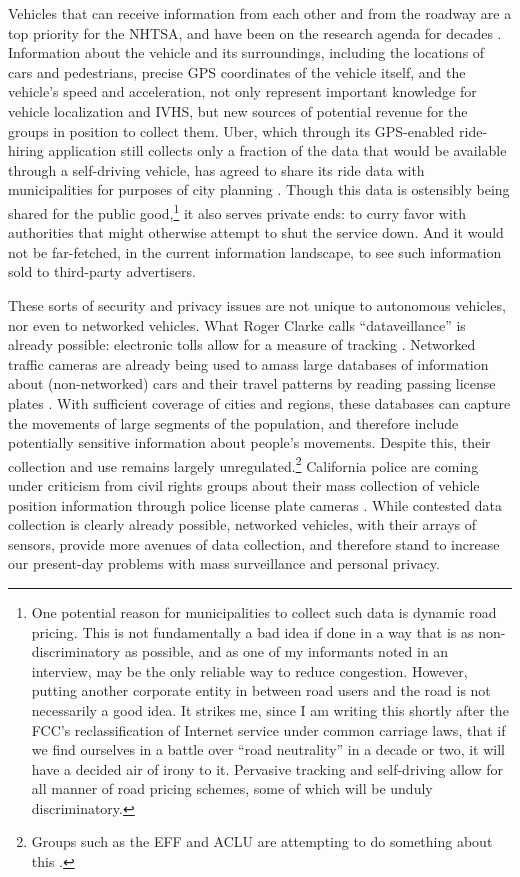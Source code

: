 Vehicles that can receive information from each other and from the
roadway are a top priority for the NHTSA, and have been on the
research agenda for decades \cite[p. 11]{wetmore}.
Information about the vehicle
and its surroundings, including the locations of cars and pedestrians,
precise GPS coordinates of the vehicle itself, and the vehicle's speed
and acceleration, not only represent important knowledge for
vehicle localization and IVHS, but new sources of potential
revenue for the groups in position to collect them. Uber, which
through its GPS-enabled ride-hiring application still collects only a
fraction of the data that would be available through a self-driving
vehicle, has agreed to share its ride data with municipalities for purposes of
city planning \cite{uberJardin}. Though this data is ostensibly being
shared for the public good,\footnote{One potential reason for municipalities to
  collect such data is dynamic road pricing. This is not fundamentally
a bad idea if done in a way that is as non-discriminatory as possible,
and as one of my informants noted in an interview, may be 
the only reliable way to reduce congestion. However, putting another
corporate entity in between road users and the road is not necessarily
a good idea. It strikes me, since I am writing this shortly after the
FCC's reclassification of Internet service under common carriage laws,
that if we find ourselves in a battle over ``road neutrality'' in a
decade or two, it will have a decided air of irony to it. Pervasive
tracking and self-driving allow for all manner of road pricing
schemes, some of which will be unduly discriminatory.} it also serves private ends:  to curry favor with
authorities that might otherwise attempt to shut the service down. And it would
not be far-fetched, in the current 
information landscape, to see such information sold to third-party advertisers.


These sorts of security and privacy issues are not unique to
autonomous vehicles, nor even to networked vehicles. What Roger Clarke
calls ``dataveillance'' is already possible: electronic tolls
allow for a measure of tracking \cite[p. 25]{nissenbaum}. Networked
traffic cameras are 
already being used to amass large databases of information about
(non-networked) cars and their travel patterns by reading passing
license plates \cite[p. 26]{nissenbaum}. With sufficient coverage of
cities and regions, 
these databases can capture the movements of large segments of the
population, and therefore include potentially sensitive information
about people's movements. Despite this, their collection and use
remains largely unregulated.\footnote{Groups such as the EFF and ACLU
  are attempting to do something about this \cite{kayyaliEFF}.}
California police are coming under 
criticism from civil rights groups about their mass collection of
vehicle position information through police license plate cameras \cite{maassCivil}.
While contested data collection is clearly already
possible, networked vehicles, with their arrays of sensors,
provide more avenues of data collection, and therefore stand to
increase our present-day problems with mass surveillance and personal
privacy.

